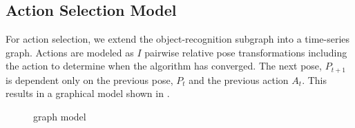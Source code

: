     \subsection{Action Selection Model}
        For action selection, we extend the object-recognition subgraph into a time-series graph. Actions are modeled as $I$ pairwise relative pose transformations including the  action to determine when the algorithm has converged. The next pose, $P_{t+1}$ is dependent only on the previous pose, $P_t$ and the previous action $A_t$. This results in a graphical model shown in .
        \begin{figure}[h]
          \centering
          \caption{graph model}
          \label{fig:fullGraph}
        \end{figure}




